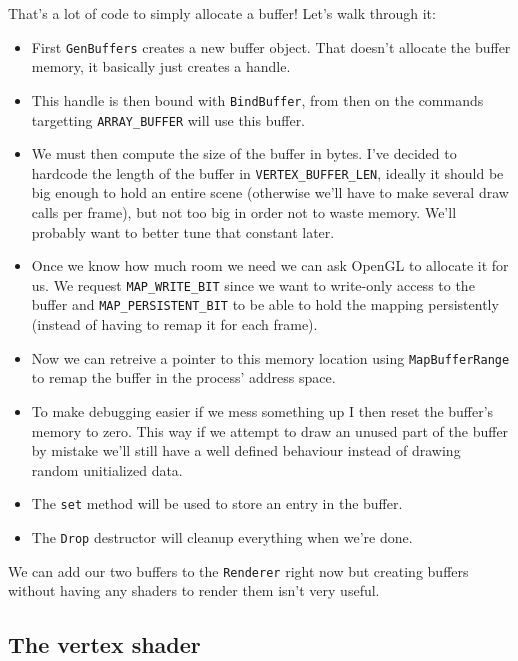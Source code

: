 \documentclass[a4paper]{article}
\newcommand{\code}[1] {\texttt{#1}}
\begin{document}
That's a lot of code to simply allocate a buffer! Let's walk through
it:

\begin{itemize}
\item First \code{GenBuffers} creates a new buffer object. That
  doesn't allocate the buffer memory, it basically just creates a
  handle.

\item This handle is then bound with \code{BindBuffer}, from then on the
  commands targetting \code{ARRAY\_BUFFER} will use this buffer.

\item We must then compute the size of the buffer in bytes. I've
  decided to hardcode the length of the buffer in
  \code{VERTEX\_BUFFER\_LEN}, ideally it should be big enough to hold
  an entire scene (otherwise we'll have to make several draw calls per
  frame), but not too big in order not to waste memory. We'll probably
  want to better tune that constant later.

\item Once we know how much room we need we can ask OpenGL to allocate
  it for us. We request \code{MAP\_WRITE\_BIT} since we want to
  write-only access to the buffer and \code{MAP\_PERSISTENT\_BIT} to
  be able to hold the mapping persistently (instead of having to remap
  it for each frame).

\item Now we can retreive a pointer to this memory location using
  \code{MapBufferRange} to remap the buffer in the process' address
  space.

\item To make debugging easier if we mess something up I then reset
  the buffer's memory to zero. This way if we attempt to draw an unused
  part of the buffer by mistake we'll still have a well defined
  behaviour instead of drawing random unitialized data.

\item The \code{set} method will be used to store an entry in the
  buffer.

\item The \code{Drop} destructor will cleanup everything when we're
  done.
\end{itemize}

We can add our two buffers to the \code{Renderer} right now but
creating buffers without having any shaders to render them isn't very useful.

\subsection{The vertex shader}
\end{document}
